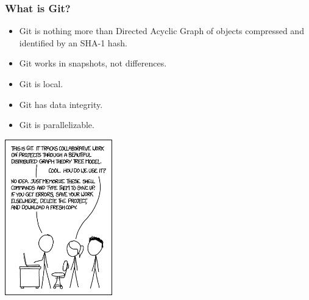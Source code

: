\documentclass{beamer}
\begin{document}
\begin{frame}
    \frametitle{What is Git?}

    \begin{multicols}{2}
        \begin{itemize}
            \item Git is nothing more than Directed Acyclic Graph of objects compressed and identified by an SHA-1 hash. %
            \item Git works in snapshots, not differences. %
                \item Git is local. %
            \item Git has data integrity. %
            \item Git is parallelizable. %
        \end{itemize}

        \begin{center}
            \includegraphics[width=0.35\textwidth]{xkcd}
        \end{center}
    \end{multicols}
\end{frame}
\end{document}
